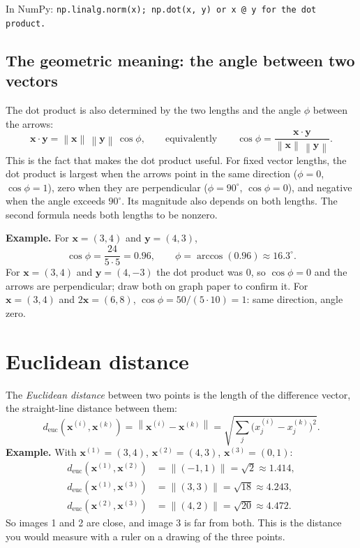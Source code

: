 \documentclass[11pt]{article}
\newcommand{\vx}{\bm{x}}
\newcommand{\vy}{\bm{y}}
\newcommand{\norm}[1]{\left\lVert #1 \right\rVert}
\newcommand{\deuc}{d_{\mathrm{euc}}}
\newcommand{\np}[1]{{\small\color{lightgray}In NumPy: \texttt{#1}}\par}
\begin{document}
\np{np.linalg.norm(x); np.dot(x, y) or x @ y for the dot product.}

\subsection{The geometric meaning: the angle between two vectors}

The dot product is also determined by the two lengths and the angle $\phi$ between the
arrows:
\[
\vx \cdot \vy = \norm{\vx}\,\norm{\vy}\,\cos\phi ,
\qquad\text{equivalently}\qquad
\cos\phi = \frac{\vx \cdot \vy}{\norm{\vx}\,\norm{\vy}} .
\]
This is the fact that makes the dot product useful. For fixed vector lengths, the dot
product is largest when the arrows point in the same direction ($\phi = 0$,
$\cos\phi = 1$), zero when they are perpendicular ($\phi = 90^\circ$, $\cos\phi = 0$), and
negative when the angle exceeds $90^\circ$. Its magnitude also depends on both lengths.
The second formula needs both lengths to be nonzero.

\textbf{Example.} For $\vx = (3, 4)$ and $\vy = (4, 3)$,
\[
\cos\phi = \frac{24}{5 \cdot 5} = 0.96, \qquad \phi = \arccos(0.96) \approx 16.3^\circ .
\]
For $\vx = (3, 4)$ and $\vy = (4, -3)$ the dot product was $0$, so $\cos\phi = 0$ and the
arrows are perpendicular; draw both on graph paper to confirm it. For $\vx = (3, 4)$ and
$2\vx = (6, 8)$, $\cos\phi = 50 / (5 \cdot 10) = 1$: same direction, angle zero.

\section{Euclidean distance}
\label{sec:euc}

The \emph{Euclidean distance} between two points is the length of the difference vector,
the straight-line distance between them:
\[
\deuc(\vx^{(i)}, \vx^{(k)}) = \norm{\vx^{(i)} - \vx^{(k)}}
= \sqrt{\textstyle\sum_j \big(x^{(i)}_j - x^{(k)}_j\big)^2} .
\]
\textbf{Example.} With $\vx^{(1)} = (3, 4)$, $\vx^{(2)} = (4, 3)$, $\vx^{(3)} = (0, 1)$:
\begin{align*}
\deuc(\vx^{(1)}, \vx^{(2)}) &= \norm{(-1, 1)} = \sqrt{2} \approx 1.414, \\
\deuc(\vx^{(1)}, \vx^{(3)}) &= \norm{(3, 3)} = \sqrt{18} \approx 4.243, \\
\deuc(\vx^{(2)}, \vx^{(3)}) &= \norm{(4, 2)} = \sqrt{20} \approx 4.472 .
\end{align*}
So images 1 and 2 are close, and image 3 is far from both. This is the distance you would
measure with a ruler on a drawing of the three points.
\end{document}
